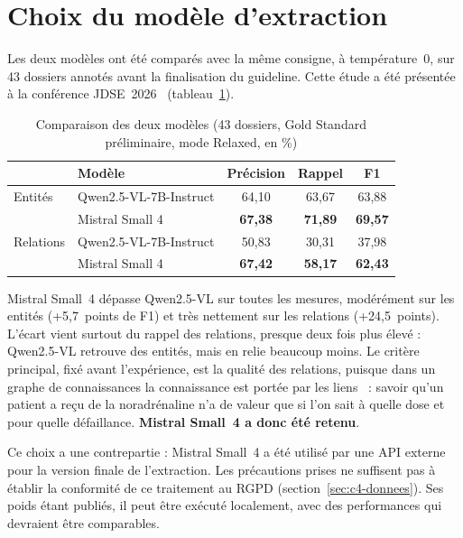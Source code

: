\section{Choix du modèle d'extraction}\label{sec:c6-choix}

Les deux modèles ont été comparés avec la même consigne, à température~0, sur 43 dossiers annotés avant la finalisation du guideline. Cette étude a été présentée à la conférence JDSE~2026~\cite{dridi2026jdse} (tableau~\ref{tab:c6-preliminaire}).

\begin{table}[H]
\centering
\caption{Comparaison des deux modèles (43 dossiers, Gold Standard préliminaire, mode Relaxed, en \%)}\label{tab:c6-preliminaire}
\small
\begin{tabular}{llccc}
\toprule
& \textbf{Modèle} & \textbf{Précision} & \textbf{Rappel} & \textbf{F1} \\
\midrule
Entités & Qwen2.5-VL-7B-Instruct & 64,10 & 63,67 & 63,88 \\
 & Mistral Small 4 & \textbf{67,38} & \textbf{71,89} & \textbf{69,57} \\
\midrule
Relations & Qwen2.5-VL-7B-Instruct & 50,83 & 30,31 & 37,98 \\
 & Mistral Small 4 & \textbf{67,42} & \textbf{58,17} & \textbf{62,43} \\
\bottomrule
\end{tabular}
\end{table}

Mistral Small~4 dépasse Qwen2.5-VL sur toutes les mesures, modérément sur les entités (+5,7~points de F1) et très nettement sur les relations (+24,5~points). L'écart vient surtout du rappel des relations, presque deux fois plus élevé : Qwen2.5-VL retrouve des entités, mais en relie beaucoup moins. Le critère principal, fixé avant l'expérience, est la qualité des relations, puisque dans un graphe de connaissances la connaissance est portée par les liens~\cite{hogan2021knowledge} : savoir qu'un patient a reçu de la noradrénaline n'a de valeur que si l'on sait à quelle dose et pour quelle défaillance. \textbf{Mistral Small~4 a donc été retenu}.

Ce choix a une contrepartie : Mistral Small~4 a été utilisé par une API externe pour la version finale de l'extraction. Les précautions prises ne suffisent pas à établir la conformité de ce traitement au RGPD (section~\ref{sec:c4-donnees}). Ses poids étant publiés, il peut être exécuté localement, avec des performances qui devraient être comparables.

